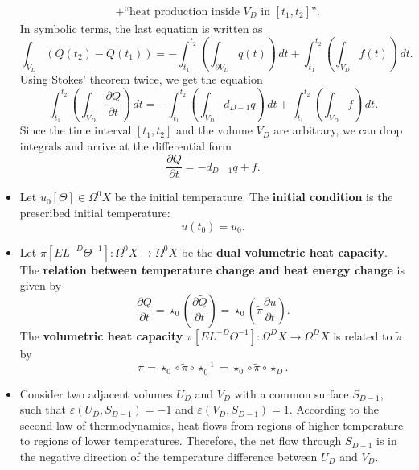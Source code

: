 \begin{discussion}
\begin{itemize}
\begin{equation}
\begin{split}
        & +
          \text{``heat production inside $V_D$ in $[t_1, t_2]$''}.
        \end{split}
      \end{equation}
      In symbolic terms, the last equation is written as
      \begin{equation}
        \int_{V_D} (Q(t_2) - Q(t_1))
        = - \int_{t_1}^{t_2}
          \left(\int_{\partial V_D} q(t) \right)\, d t
        + \int_{t_1}^{t_2} \left(\int_{V_D} f(t) \right)\, d t.
      \end{equation}
      Using Stokes' theorem twice, we get the equation
      \begin{equation}
        \int_{t_1}^{t_2}
          \left(\int_{V_D} \frac{\partial Q}{\partial t}\right)\, d t =
        - \int_{t_1}^{t_2} \left(\int_{V_D} d_{D - 1} q \right)\, d t
        + \int_{t_1}^{t_2} \left(\int_{V_D} f \right)\, d t.
      \end{equation}
      Since the time interval $[t_1, t_2]$ and the volume $V_D$ are arbitrary,
      we can drop integrals and arrive at the differential form
      \begin{equation}
        \frac{\partial Q}{\partial t} = - d_{D - 1} q + f.
      \end{equation}
    \item
      Let $u_0 [\Theta] \in \Omega^0 X$ be the initial temperature.
      The \textbf{initial condition} is the prescribed initial temperature:
      \begin{equation}
        u(t_0) = u_0.
      \end{equation}
    \item
      Let $\tilde{\pi} [E L^{-D} \Theta^{-1}] \colon \Omega^0 X \to \Omega^0 X$
      be the \textbf{dual volumetric heat capacity}.
      The \textbf{relation between temperature change and heat energy change}
      is given by
      \begin{equation}
        \frac{\partial Q}{\partial t}
        = \star_0 \left(\frac{\partial \tilde{Q}}{\partial t}\right)
        = \star_0 \left(\tilde{\pi} \frac{\partial u}{\partial t}\right).
      \end{equation}
      The \textbf{volumetric heat capacity}
      $\pi [E L^{-D} \Theta^{-1}] \colon \Omega^D X \to \Omega^D X$
      is related to $\tilde{\pi}$ by
      \begin{equation}
        \pi
        = \star_0 \circ \tilde{\pi} \circ \star_0^{-1}
        = \star_0 \circ \tilde{\pi} \circ \star_D.
      \end{equation}
    \item
      Consider two adjacent volumes $U_D$ and $V_D$
      with a common surface $S_{D - 1}$, such that
      $\varepsilon(U_D, S_{D - 1}) = -1$ and
      $\varepsilon(V_D, S_{D - 1}) = 1$.
      According to the second law of thermodynamics, heat flows from regions of
      higher temperature to regions of lower temperatures.
      Therefore, the net flow through $S_{D - 1}$ is in the negative direction
      of the temperature difference between $U_D$ and $V_D$.


\end{itemize}
\end{discussion}
